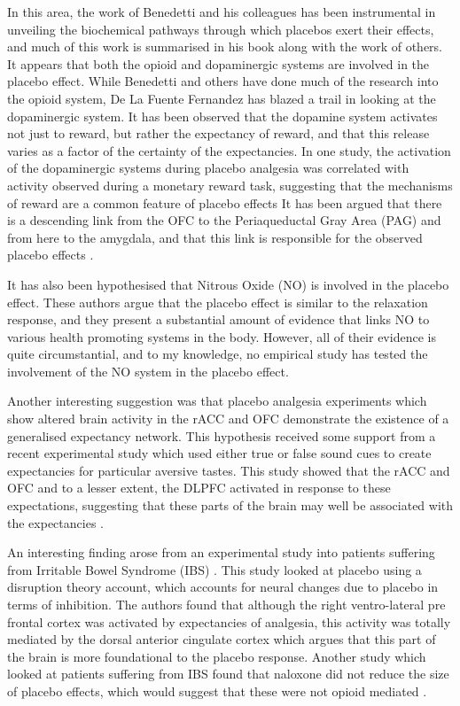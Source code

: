 In this area, the work of Benedetti and his colleagues has been instrumental in unveiling the biochemical pathways through which placebos exert their effects, and much of this work is summarised in his book  along with the work of others. It appears that both the opioid and dopaminergic systems are involved in the placebo effect. While Benedetti and others have done much of the research into the opioid system, De La Fuente Fernandez \cite{DeLaFuente-Fernandez2002} has blazed a trail in looking at the dopaminergic system. It has been observed that the dopamine system activates not just to reward, but rather the expectancy of reward, and that this release varies as a factor of the certainty of the expectancies. In one study, the activation of the dopaminergic systems during placebo analgesia was correlated with activity observed during a monetary reward task, suggesting that the mechanisms of reward are a common feature of placebo effects\cite{Scott2007a}  It has been argued that there is a descending link from the OFC to the Periaqueductal Gray Area (PAG) and from here to the amygdala, and that this link is responsible for the observed placebo effects \cite{Fuente-Fernandez2002}.

It has also been hypothesised \cite{Stefano2001,Fricchione2005} that Nitrous Oxide (NO) is involved in the placebo effect. These authors argue that the placebo effect is similar to the relaxation response, and they present a substantial amount of evidence that links NO to various health promoting systems in the body. However, all of their evidence is quite circumstantial, and to my knowledge, no empirical study has tested the involvement of the NO system in the placebo effect. 

 Another interesting suggestion was that placebo analgesia experiments which show altered brain activity in the rACC and OFC demonstrate the existence of a generalised expectancy network. This hypothesis received some support from a recent experimental study which used either true or false sound cues to create expectancies for particular aversive tastes. This study showed that the rACC and OFC and to a lesser extent, the DLPFC activated in response to these expectations, suggesting that these parts of the brain may well be associated with the expectancies \cite{Sarinopoulos2006}. 
 
An interesting finding arose from an experimental study into patients suffering from Irritable Bowel Syndrome (IBS) \cite{Lieberman2004}. This study looked at placebo using a disruption theory account, which accounts for neural changes due to placebo in terms of inhibition. The authors found that although the right ventro-lateral pre frontal cortex was activated by expectancies of analgesia, this activity was totally mediated by the dorsal anterior cingulate cortex which argues that this part of the brain is more foundational to the placebo response.  Another study which looked at patients suffering from IBS found that naloxone did not reduce the size of placebo effects, which would suggest that these were not opioid mediated \cite{Vase2005}.

